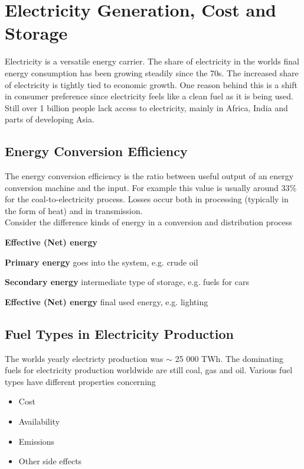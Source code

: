 \section{Electricity Generation, Cost and Storage}

Electricity is a versatile energy carrier.
The share of electricity in the worlds final energy consumption has been growing steadily since the 70s.
The increased share of electricity is tightly tied to economic growth.
One reason behind this is a shift in consumer preference since electricity feels like a clean fuel as it is being used.
Still over 1 billion people lack access to electricity, mainly in Africa, India and parts of developing Asia.

\subsection{Energy Conversion Efficiency}
The energy conversion efficiency is the ratio between useful output of an energy conversion machine and the input.
For example this value is usually around 33\% for the coal-to-electricity process.
Losses occur both in processing (typically in the form of heat) and in transmission.\\

Consider the difference kinds of energy in a conversion and distribution process

\begin{labeling}{\textbf{Effective (Net) energy}}
    \item [\textbf{Primary energy}] goes into the system, e.g. crude oil
    \item [\textbf{Secondary energy}] intermediate type of storage, e.g. fuels for cars
    \item [\textbf{Effective (Net) energy}] final used energy, e.g. lighting
\end{labeling}

\subsection{Fuel Types in Electricity Production}

The worlds yearly electricty production was $\sim$ 25 000 TWh.
The dominating fuels for electricity production worldwide are still coal, gas and oil.
Various fuel types have different properties concerning

\begin{itemize}
    \item Cost
    \item Availability
    \item Emissions
    \item Other side effects
\end{itemize}

